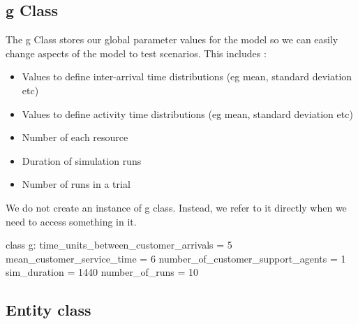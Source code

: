 \documentclass[
  letterpaper,
  DIV=11,
  numbers=noendperiod]{scrreprt}
\newenvironment{Shaded}{}{}
\newcommand{\DecValTok}[1]{\textcolor[rgb]{0.00,0.36,0.77}{#1}}
\newcommand{\KeywordTok}[1]{\textcolor[rgb]{0.84,0.23,0.29}{#1}}
\newcommand{\NormalTok}[1]{\textcolor[rgb]{0.14,0.16,0.18}{#1}}
\newcommand{\OperatorTok}[1]{\textcolor[rgb]{0.14,0.16,0.18}{#1}}
\providecommand{\tightlist}{%
  \setlength{\itemsep}{0pt}\setlength{\parskip}{0pt}}\usepackage{longtable,booktabs,array}
\begin{document}
\subsection{g Class}\label{g-class}

The g Class stores our global parameter values for the model so we can
easily change aspects of the model to test scenarios. This includes :

\begin{itemize}
\tightlist
\item
  Values to define inter-arrival time distributions (eg mean, standard
  deviation etc)
\item
  Values to define activity time distributions (eg mean, standard
  deviation etc)
\item
  Number of each resource
\item
  Duration of simulation runs
\item
  Number of runs in a trial
\end{itemize}

We do not create an instance of g class. Instead, we refer to it
directly when we need to access something in it.

\begin{tcolorbox}[enhanced jigsaw, colframe=quarto-callout-note-color-frame, bottomtitle=1mm, breakable, rightrule=.15mm, coltitle=black, colbacktitle=quarto-callout-note-color!10!white, opacityback=0, leftrule=.75mm, arc=.35mm, toptitle=1mm, title=\textcolor{quarto-callout-note-color}{\faInfo}\hspace{0.5em}{Example g class}, titlerule=0mm, colback=white, toprule=.15mm, bottomrule=.15mm, left=2mm, opacitybacktitle=0.6]

\begin{Shaded}
\begin{Highlighting}[]
\KeywordTok{class}\NormalTok{ g:}
\NormalTok{    time\_units\_between\_customer\_arrivals }\OperatorTok{=} \DecValTok{5}
\NormalTok{    mean\_customer\_service\_time }\OperatorTok{=} \DecValTok{6}
\NormalTok{    number\_of\_customer\_support\_agents }\OperatorTok{=} \DecValTok{1}
\NormalTok{    sim\_duration }\OperatorTok{=} \DecValTok{1440}
\NormalTok{    number\_of\_runs }\OperatorTok{=} \DecValTok{10}
\end{Highlighting}
\end{Shaded}

\end{tcolorbox}

\subsection{Entity class}\label{entity-class}
\end{document}
